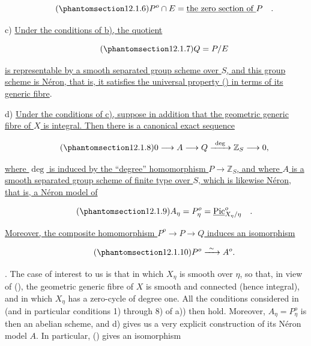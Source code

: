 \begin{equation}\tag{\SGARefTarget{sga7.sga7i.eix.n12-1-6}{12.1.6}}
 P^o\cap E=\underline{\text{the zero section of }}P \quad .
\end{equation}

\noindent
c) \underline{Under the conditions of b), the quotient}

\begin{equation}\tag{\SGARefTarget{sga7.sga7i.eix.n12-1-7}{12.1.7}}
 Q=P/E
\end{equation}

\noindent
\underline{is representable by a smooth separated group scheme over $S$,
and this group scheme is N\'eron, that is, it satisfies the universal
property () in terms of its generic fibre}.

\medskip
\noindent
d) \underline{Under the conditions of c), suppose in addition that the
geometric generic fibre of $X$ is integral. Then there is a canonical
exact sequence}

\begin{equation}\tag{\SGARefTarget{sga7.sga7i.eix.n12-1-8}{12.1.8}}
 0\longrightarrow A\longrightarrow Q
   \xrightarrow{\ \deg\ }\mathbb Z_S\longrightarrow0,
\end{equation}

\noindent
\underline{where $\deg$ is induced by the ``degree'' homomorphism
$P\to\mathbb Z_S$, and where $A$ is a smooth separated group scheme of
finite type over $S$, which is likewise N\'eron, that is, a N\'eron model
of}

\begin{equation}\tag{\SGARefTarget{sga7.sga7i.eix.n12-1-9}{12.1.9}}
 A_\eta=P_\eta^o=
 \underline{\operatorname{Pic}}^o_{X_\eta/\eta} \quad .
\end{equation}

\noindent
\underline{Moreover, the composite homomorphism $P^o\to P\to Q$ induces
an isomorphism}

\begin{equation}\tag{\SGARefTarget{sga7.sga7i.eix.n12-1-10}{12.1.10}}
 P^o\xrightarrow{\ \sim\ }A^o.
\end{equation}

\medskip
\noindent
{}. The case of interest to us is that in which $X_\eta$ is smooth
over $\eta$, so that, in view of (), the geometric generic fibre of
$X$ is smooth and connected (hence integral), and in which $X_\eta$ has a
zero-cycle of degree one. All the conditions considered in  (and in
particular conditions 1) through 8) of a)) then hold. Moreover,
$A_\eta=P_\eta^o$ is then an abelian scheme, and d) gives us a very
explicit construction of its N\'eron model $A$. In particular, ()
gives an isomorphism

